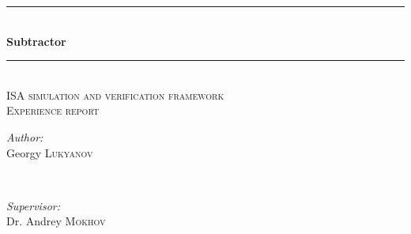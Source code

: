 \begin{titlepage}

\newcommand{\HRule}{\rule{\linewidth}{0.5mm}} %

\center %




\HRule \\[0.4cm]
{ \huge \bfseries Subtractor}\\[0.4cm] %
\HRule \\[1.5cm]

\textsc{\Large ISA simulation and verification framework}\\[0.5cm] %
\textsc{\large Experience report}\\[0.5cm] %


\begin{minipage}{0.4\textwidth}
\begin{flushleft} \large
\emph{Author:}\\
Georgy \textsc{Lukyanov} %
\end{flushleft}
\end{minipage}
~
\begin{minipage}{0.4\textwidth}
\begin{flushright} \large
\emph{Supervisor:} \\
Dr. Andrey \textsc{Mokhov} %
\end{flushright}
\end{minipage}\\[2cm]



\end{titlepage}
